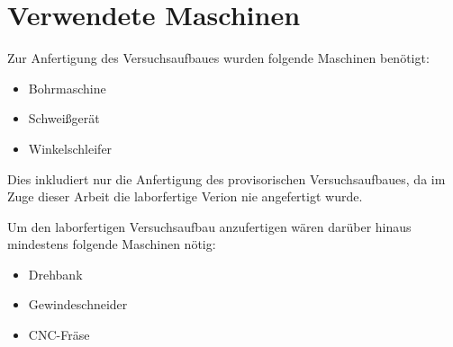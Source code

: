 \section{Verwendete Maschinen}

Zur Anfertigung des Versuchsaufbaues wurden folgende Maschinen benötigt:

\begin{itemize}
    \item Bohrmaschine
    \item Schweißgerät
    \item Winkelschleifer
\end{itemize}

Dies inkludiert nur die Anfertigung des provisorischen Versuchsaufbaues, da im Zuge dieser Arbeit die laborfertige Verion nie angefertigt wurde.

Um den laborfertigen Versuchsaufbau anzufertigen wären darüber hinaus mindestens folgende Maschinen nötig:

\begin{itemize}
    \item Drehbank
    \item Gewindeschneider
    \item CNC-Fräse
\end{itemize}